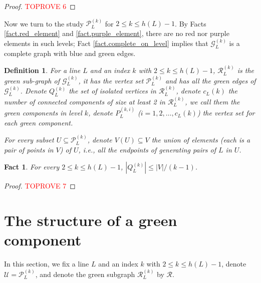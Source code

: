 \documentclass[12pt]{article}
\newtheorem{fact}{Fact}
\newtheorem{defi}{Definition}
\begin{document}
\begin{proof}\textcolor{red}{TOPROVE 6}\end{proof}

Now we turn to the study $\mathcal{P}_L^{(k)}$ for $2 \le k \le h(L)-1$.
By Facts \ref{fact.red_element} and \ref{fact.purple_element},
there are no red nor purple elements in such levels;
Fact \ref{fact.complete_on_level} implies that $\mathcal{G}_L^{(k)}$
is a complete graph with blue and green edges.

\begin{defi}
For a line $L$ and an index $k$ with $2 \le k \le h(L)-1$,
$\mathcal{R}_L^{(k)}$ is the green sub-graph of $\mathcal{G}_L^{(k)}$,
it has the vertex set $\mathcal{P}_L^{(k)}$ and has all the green edges of $\mathcal{G}_L^{(k)}$.
Denote $Q_L^{(k)}$ the set of isolated vertices in $\mathcal{R}_L^{(k)}$,
denote $c_L(k)$ the number of connected components of size at least 2 in $\mathcal{R}_L^{(k)}$,
we call them the {\em green components in level $k$},
denote $P_L^{(k, i)}$ ($i = 1, 2, \dots, c_L(k)$) the vertex set for each green component.

For every subset $U \subseteq \mathcal{P}_L^{(k)}$,
denote $V(U) \subseteq V$ the union of elements (each is a pair of points in $V$) of $U$,
i.e., all the endpoints of generating pairs of $L$ in $U$.
\end{defi}

\begin{fact}\label{fact.Q_size}
For every $2 \le  k \le h(L)-1$, $\left|Q_L^{(k)}\right| \le |V|/(k-1)$.
\end{fact}

\begin{proof}\textcolor{red}{TOPROVE 7}\end{proof}

\section{The structure of a green component}\label{sect.green_cpt}

In this section, we fix a line $L$ and an index $k$ with $2 \le  k \le h(L)-1$,
denote $\mathcal{U} = \mathcal{P}_L^{(k)}$,
and denote the green subgraph $\mathcal{R}_L^{(k)}$ by $\mathcal{R}$.
\end{document}
